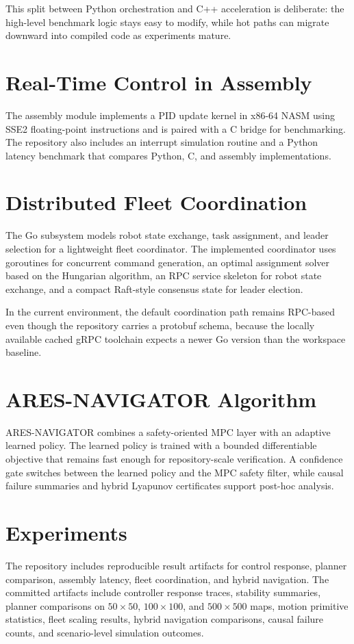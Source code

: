 \documentclass[letterpaper, 10 pt, conference]{ieeeconf}
\begin{document}
This split between Python orchestration and C++ acceleration is deliberate: the
high-level benchmark logic stays easy to modify, while hot paths can migrate
downward into compiled code as experiments mature.

\section{Real-Time Control in Assembly}
The assembly module implements a PID update kernel in x86-64 NASM using SSE2
floating-point instructions and is paired with a C bridge for benchmarking.
The repository also includes an interrupt simulation routine and a Python
latency benchmark that compares Python, C, and assembly implementations.

\section{Distributed Fleet Coordination}
The Go subsystem models robot state exchange, task assignment, and leader
selection for a lightweight fleet coordinator. The implemented coordinator uses
goroutines for concurrent command generation, an optimal assignment solver based
on the Hungarian algorithm, an RPC service skeleton for robot state exchange,
and a compact Raft-style consensus state for leader election.

In the current environment, the default coordination path remains RPC-based even
though the repository carries a protobuf schema, because the locally available
cached gRPC toolchain expects a newer Go version than the workspace baseline.

\section{ARES-NAVIGATOR Algorithm}
ARES-NAVIGATOR combines a safety-oriented MPC layer with an adaptive learned
policy. The learned policy is trained with a bounded differentiable objective
that remains fast enough for repository-scale verification. A confidence gate
switches between the learned policy and the MPC safety filter, while causal
failure summaries and hybrid Lyapunov certificates support post-hoc analysis.

\section{Experiments}
The repository includes reproducible result artifacts for control response,
planner comparison, assembly latency, fleet coordination, and hybrid navigation.
The committed artifacts include controller response traces, stability summaries,
planner comparisons on $50\times50$, $100\times100$, and $500\times500$ maps,
motion primitive statistics, fleet scaling results, hybrid navigation
comparisons, causal failure counts, and scenario-level simulation outcomes.
\end{document}
